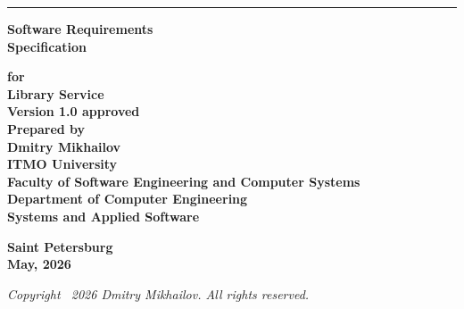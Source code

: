 \documentclass[12pt,a4paper]{article}
\begin{document}
	
	\begin{titlepage}
		
		\noindent\rule{\textwidth}{1.5pt}
		
		\vspace*{2.5cm}
		
		\begin{flushright}
			{\Huge \textbf{Software Requirements}}\\[0.2cm]
			{\Huge \textbf{Specification}}
		\end{flushright}
		
		\vspace{2cm}
		
		\begin{flushright}
			{\Large \textbf{for}}\\[1cm]
			
			{\LARGE \textbf{Library Service}}\\[0.4cm]
			
			{\large \textbf{Version 1.0 approved}}\\[1.5cm]
			
			{\large \textbf{Prepared by}}\\[0.3cm]
			{\large \textbf{Dmitry Mikhailov}}\\[1.5cm]
			
			{\large \textbf{ITMO University}}\\[0.3cm]
			{\large \textbf{Faculty of Software Engineering and Computer Systems}}\\[0.3cm]
			{\large \textbf{Department of Computer Engineering}}\\[0.3cm]
			{\large \textbf{Systems and Applied Software}}
		\end{flushright}
		
		\vfill
		
		\begin{center}
			{\large \textbf{Saint Petersburg}}\\
			{\large \textbf{May, 2026}}
		\end{center}
		
		\vspace{1cm}
		
		\begin{center}
			{\small \textit{Copyright \textcopyright\ 2026 Dmitry Mikhailov. All rights reserved.}}
		\end{center}
		
	\end{titlepage}
	
	\tableofcontents
	\newpage
	
\end{document}
